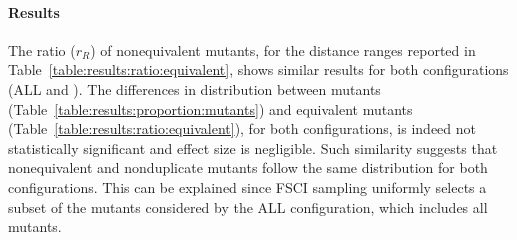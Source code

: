 




\paragraph{Results}


The ratio ($r_R$) of nonequivalent mutants, for the distance ranges reported in Table~\ref{table:results:ratio:equivalent}, shows
similar results for both configurations (ALL and \APPR). 
The differences in distribution between mutants (Table~\ref{table:results:proportion:mutants}) and equivalent mutants  (Table~\ref{table:results:ratio:equivalent}), for both  configurations, is indeed not statistically significant and effect size is negligible.
Such similarity suggests that nonequivalent and nonduplicate mutants follow the same distribution for both configurations. This can be explained since 
FSCI sampling uniformly selects 
a subset of the mutants considered by the ALL configuration, which includes all mutants. 



